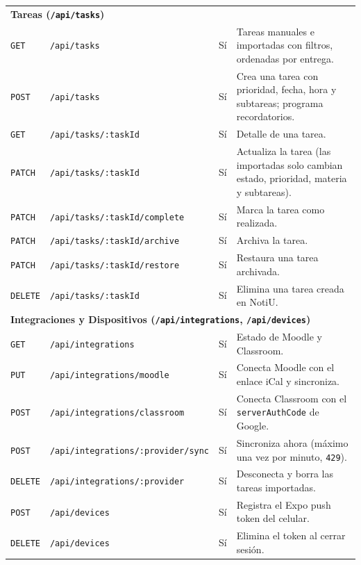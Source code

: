 \documentclass[11pt,letterpaper]{article}
\begin{document}
{\begin{longtable}{l >{\raggedright\arraybackslash}p{5.6cm} c >{\raggedright\arraybackslash}p{5.4cm}}
  \multicolumn{4}{l}{\textbf{\textcolor{carmesiOscuroA}{Tareas (\texttt{/api/tasks})}}} \\
  \texttt{GET} & \texttt{/api/tasks} & Sí & Tareas manuales e importadas con filtros, ordenadas por entrega. \\
  \texttt{POST} & \texttt{/api/tasks} & Sí & Crea una tarea con prioridad, fecha, hora y subtareas; programa recordatorios. \\
  \texttt{GET} & \texttt{/api/tasks/:taskId} & Sí & Detalle de una tarea. \\
  \texttt{PATCH} & \texttt{/api/tasks/:taskId} & Sí & Actualiza la tarea (las importadas solo cambian estado, prioridad, materia y subtareas). \\
  \texttt{PATCH} & \texttt{/api/tasks/:taskId/complete} & Sí & Marca la tarea como realizada. \\
  \texttt{PATCH} & \texttt{/api/tasks/:taskId/archive} & Sí & Archiva la tarea. \\
  \texttt{PATCH} & \texttt{/api/tasks/:taskId/restore} & Sí & Restaura una tarea archivada. \\
  \texttt{DELETE} & \texttt{/api/tasks/:taskId} & Sí & Elimina una tarea creada en NotiU. \\
  \midrule

  \multicolumn{4}{l}{\textbf{\textcolor{carmesiOscuroA}{Integraciones y Dispositivos (\texttt{/api/integrations}, \texttt{/api/devices})}}} \\
  \texttt{GET} & \texttt{/api/integrations} & Sí & Estado de Moodle y Classroom. \\
  \texttt{PUT} & \texttt{/api/integrations/moodle} & Sí & Conecta Moodle con el enlace iCal y sincroniza. \\
  \texttt{POST} & \texttt{/api/integrations/classroom} & Sí & Conecta Classroom con el \texttt{serverAuthCode} de Google. \\
  \texttt{POST} & \texttt{/api/integrations/:provider/sync} & Sí & Sincroniza ahora (máximo una vez por minuto, \texttt{429}). \\
  \texttt{DELETE} & \texttt{/api/integrations/:provider} & Sí & Desconecta y borra las tareas importadas. \\
  \texttt{POST} & \texttt{/api/devices} & Sí & Registra el Expo push token del celular. \\
  \texttt{DELETE} & \texttt{/api/devices} & Sí & Elimina el token al cerrar sesión. \\
\end{longtable}
}
\end{document}
